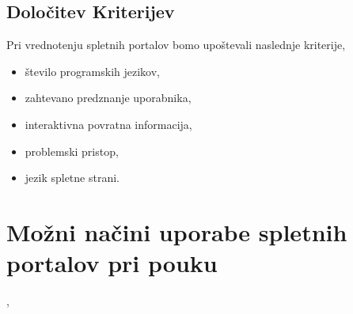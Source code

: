 \subsection{Določitev Kriterijev}
\label{sec:dolocitev_kriterijev}

Pri vrednotenju spletnih portalov bomo upoštevali naslednje
kriterije,


\begin{itemize}
\tightlist
\item število programskih jezikov,
\item zahtevano predznanje uporabnika,
\item interaktivna povratna informacija,
\item problemski pristop,
\item jezik spletne strani.
\end{itemize}

\section{Možni načini uporabe spletnih portalov pri pouku}
\label{sec:načini_uporabe_sp},
